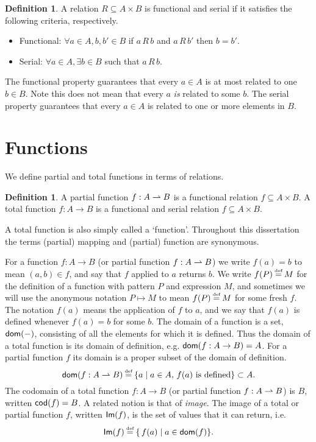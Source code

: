 \documentclass[12pt,phd,lfcs,twoside,openright,logo,leftchapter,normalheadings]{infthesis}
\theoremstyle{plain}
\theoremstyle{definition}
\newtheorem{definition}[theorem]{Definition}
\begin{document}
\begin{definition}
  A relation $R \subseteq A \times B$ is functional and serial if it
  satisfies the following criteria, respectively.
  \begin{itemize}
    \item Functional: $\forall a \in A, b,b' \in B$ if  $a\,R\,b$ and $a\,R\,b'$ then $b = b'$.
    \item Serial: $\forall a \in A,\exists b \in B$ such that
      $a\,R\,b$.
  \end{itemize}
\end{definition}
%
The functional property guarantees that every $a \in A$ is at most
related to one $b \in B$. Note this does not mean that every $a$
\emph{is} related to some $b$. The serial property guarantees that
every $a \in A$ is related to one or more elements in $B$.
%

\section{Functions}
\label{sec:functions}
We define partial and total functions in terms of relations.
%
\begin{definition}
  A partial function $f : A \rightharpoonup B$ is a functional relation
  $f \subseteq A \times B$.
  A total function $f : A \to B$ is a functional and serial relation
  $f \subseteq A \times B$.
\end{definition}
%
A total function is also simply called a `function'. Throughout this
dissertation the terms (partial) mapping and (partial) function are
synonymous.
%

For a function $f : A \to B$ (or partial function $f : A \rightharpoonup B$) we
write $f(a) = b$ to mean $(a, b) \in f$, and say that $f$ applied to
$a$ returns $b$. We write $f(P) \defas M$ for the definition of a
function with pattern $P$ and expression $M$, and sometimes we will
use the anonymous notation $P \mapsto M$ to mean $f(P) \defas M$ for
some fresh $f$.  The notation $f(a)$ means the application of $f$ to
$a$, and we say that $f(a)$ is defined whenever $f(a) = b$ for some
$b$.
%
The domain of a function is a set, $\mathsf{dom}(-)$, consisting of all the
elements for which it is defined. Thus the domain of a total function
is its domain of definition, e.g. $\mathsf{dom}(f : A \to B) = A$.
%
For a partial function $f$ its domain is a proper subset of the domain
of definition.
%
\[
  \dom(f : A \pto B) \defas \{ a \mid a \in A,\, f(a) \text{ is defined} \} \subset A.
\]
%
The codomain of a total function $f : A \to B$ (or partial function
$f : A \rightharpoonup B$) is $B$, written $\mathsf{cod}(f) = B$. A related notion
is that of \emph{image}. The image of a total or partial function $f$,
written $\mathsf{Im}(f)$, is the set of values that it can return, i.e.
%
\[
    \dec{Im}(f) \defas \{\, f(a) \mid a \in \dom(f) \}.
\]
\end{document}
